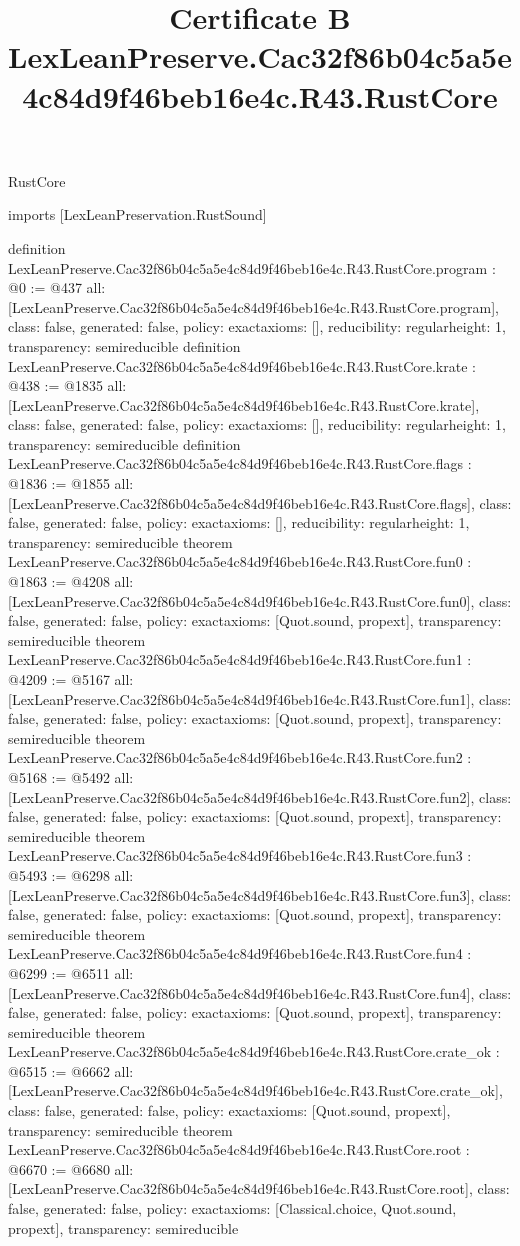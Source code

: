 \begin{lexlean}{RustCore}
\title{Certificate B LexLeanPreserve.Cac32f86b04c5a5e4c84d9f46beb16e4c.R43.RustCore}
\begin{coremodule}
imports [LexLeanPreservation.RustSound]

definition LexLeanPreserve.Cac32f86b04c5a5e4c84d9f46beb16e4c.R43.RustCore.program : @0 := @437 {
  all: [LexLeanPreserve.Cac32f86b04c5a5e4c84d9f46beb16e4c.R43.RustCore.program],
  class: false,
  generated: false,
  policy: exact{axioms: []},
  reducibility: regular{height: 1},
  transparency: semireducible
}
definition LexLeanPreserve.Cac32f86b04c5a5e4c84d9f46beb16e4c.R43.RustCore.krate : @438 := @1835 {
  all: [LexLeanPreserve.Cac32f86b04c5a5e4c84d9f46beb16e4c.R43.RustCore.krate],
  class: false,
  generated: false,
  policy: exact{axioms: []},
  reducibility: regular{height: 1},
  transparency: semireducible
}
definition LexLeanPreserve.Cac32f86b04c5a5e4c84d9f46beb16e4c.R43.RustCore.flags : @1836 := @1855 {
  all: [LexLeanPreserve.Cac32f86b04c5a5e4c84d9f46beb16e4c.R43.RustCore.flags],
  class: false,
  generated: false,
  policy: exact{axioms: []},
  reducibility: regular{height: 1},
  transparency: semireducible
}
theorem LexLeanPreserve.Cac32f86b04c5a5e4c84d9f46beb16e4c.R43.RustCore.fun0 : @1863 := @4208 {
  all: [LexLeanPreserve.Cac32f86b04c5a5e4c84d9f46beb16e4c.R43.RustCore.fun0],
  class: false,
  generated: false,
  policy: exact{axioms: [Quot.sound, propext]},
  transparency: semireducible
}
theorem LexLeanPreserve.Cac32f86b04c5a5e4c84d9f46beb16e4c.R43.RustCore.fun1 : @4209 := @5167 {
  all: [LexLeanPreserve.Cac32f86b04c5a5e4c84d9f46beb16e4c.R43.RustCore.fun1],
  class: false,
  generated: false,
  policy: exact{axioms: [Quot.sound, propext]},
  transparency: semireducible
}
theorem LexLeanPreserve.Cac32f86b04c5a5e4c84d9f46beb16e4c.R43.RustCore.fun2 : @5168 := @5492 {
  all: [LexLeanPreserve.Cac32f86b04c5a5e4c84d9f46beb16e4c.R43.RustCore.fun2],
  class: false,
  generated: false,
  policy: exact{axioms: [Quot.sound, propext]},
  transparency: semireducible
}
theorem LexLeanPreserve.Cac32f86b04c5a5e4c84d9f46beb16e4c.R43.RustCore.fun3 : @5493 := @6298 {
  all: [LexLeanPreserve.Cac32f86b04c5a5e4c84d9f46beb16e4c.R43.RustCore.fun3],
  class: false,
  generated: false,
  policy: exact{axioms: [Quot.sound, propext]},
  transparency: semireducible
}
theorem LexLeanPreserve.Cac32f86b04c5a5e4c84d9f46beb16e4c.R43.RustCore.fun4 : @6299 := @6511 {
  all: [LexLeanPreserve.Cac32f86b04c5a5e4c84d9f46beb16e4c.R43.RustCore.fun4],
  class: false,
  generated: false,
  policy: exact{axioms: [Quot.sound, propext]},
  transparency: semireducible
}
theorem LexLeanPreserve.Cac32f86b04c5a5e4c84d9f46beb16e4c.R43.RustCore.crate_ok : @6515 := @6662 {
  all: [LexLeanPreserve.Cac32f86b04c5a5e4c84d9f46beb16e4c.R43.RustCore.crate_ok],
  class: false,
  generated: false,
  policy: exact{axioms: [Quot.sound, propext]},
  transparency: semireducible
}
theorem LexLeanPreserve.Cac32f86b04c5a5e4c84d9f46beb16e4c.R43.RustCore.root : @6670 := @6680 {
  all: [LexLeanPreserve.Cac32f86b04c5a5e4c84d9f46beb16e4c.R43.RustCore.root],
  class: false,
  generated: false,
  policy: exact{axioms: [Classical.choice, Quot.sound, propext]},
  transparency: semireducible
}


\end{coremodule}
\end{lexlean}
